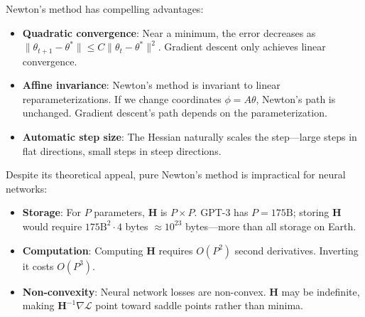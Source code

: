 \begin{remark}
    Newton's method has compelling advantages:
    \begin{itemize}
        \item \textbf{Quadratic convergence}: Near a minimum, the error decreases as $\|\theta_{t+1} - \theta^*\| \leq C\|\theta_t - \theta^*\|^2$. Gradient descent only achieves linear convergence.
        \item \textbf{Affine invariance}: Newton's method is invariant to linear reparameterizations. If we change coordinates $\phi = A\theta$, Newton's path is unchanged. Gradient descent's path depends on the parameterization.
        \item \textbf{Automatic step size}: The Hessian naturally scales the step---large steps in flat directions, small steps in steep directions.
    \end{itemize}
\end{remark}

\begin{remark}
    Despite its theoretical appeal, pure Newton's method is impractical for neural networks:
    \begin{itemize}
        \item \textbf{Storage}: For $P$ parameters, $\mathbf{H}$ is $P \times P$. GPT-3 has $P = 175\text{B}$; storing $\mathbf{H}$ would require $175\text{B}^2 \cdot 4$ bytes $\approx 10^{23}$ bytes---more than all storage on Earth.
        \item \textbf{Computation}: Computing $\mathbf{H}$ requires $O(P^2)$ second derivatives. Inverting it costs $O(P^3)$.
        \item \textbf{Non-convexity}: Neural network losses are non-convex. $\mathbf{H}$ may be indefinite, making $\mathbf{H}^{-1}\nabla\mathcal{L}$ point toward saddle points rather than minima.
    \end{itemize}
\end{remark}

